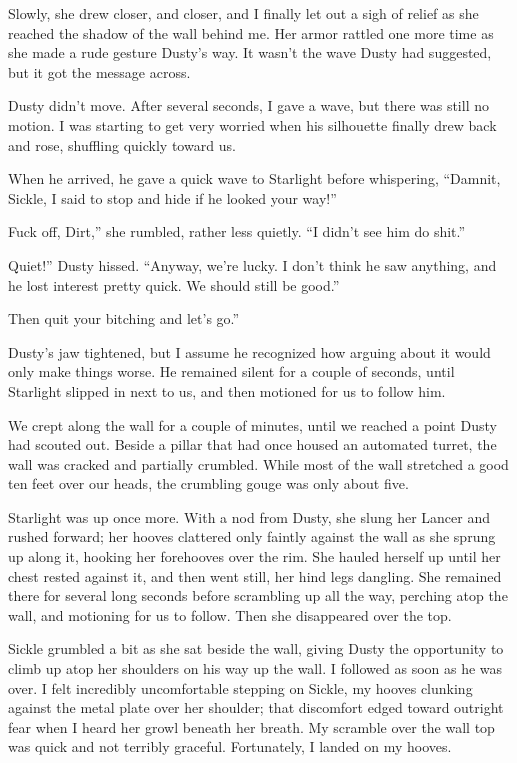 Slowly, she drew closer, and closer, and I finally let out a sigh of relief as she reached the shadow of the wall behind me. Her armor rattled one more time as she made a rude gesture Dusty’s way. It wasn’t the wave Dusty had suggested, but it got the message across.

Dusty didn’t move. After several seconds, I gave a wave, but there was still no motion. I was starting to get very worried when his silhouette finally drew back and rose, shuffling quickly toward us.

When he arrived, he gave a quick wave to Starlight before whispering, “Damnit, Sickle, I said to stop and hide if he looked your way!”

\leavevmode{}Fuck off, Dirt,” she rumbled, rather less quietly. “I didn’t see him do shit.”

\leavevmode{}Quiet!” Dusty hissed. “Anyway, we’re lucky. I don’t think he saw anything, and he lost interest pretty quick. We should still be good.”

\leavevmode{}Then quit your bitching and let’s go.”

Dusty’s jaw tightened, but I assume he recognized how arguing about it would only make things worse. He remained silent for a couple of seconds, until Starlight slipped in next to us, and then motioned for us to follow him.

We crept along the wall for a couple of minutes, until we reached a point Dusty had scouted out. Beside a pillar that had once housed an automated turret, the wall was cracked and partially crumbled. While most of the wall stretched a good ten feet over our heads, the crumbling gouge was only about five.

Starlight was up once more. With a nod from Dusty, she slung her Lancer and rushed forward; her hooves clattered only faintly against the wall as she sprung up along it, hooking her forehooves over the rim. She hauled herself up until her chest rested against it, and then went still, her hind legs dangling. She remained there for several long seconds before scrambling up all the way, perching atop the wall, and motioning for us to follow. Then she disappeared over the top.

Sickle grumbled a bit as she sat beside the wall, giving Dusty the opportunity to climb up atop her shoulders on his way up the wall. I followed as soon as he was over. I felt incredibly uncomfortable stepping on Sickle, my hooves clunking against the metal plate over her shoulder; that discomfort edged toward outright fear when I heard her growl beneath her breath. My scramble over the wall top was quick and not terribly graceful. Fortunately, I landed on my hooves.

